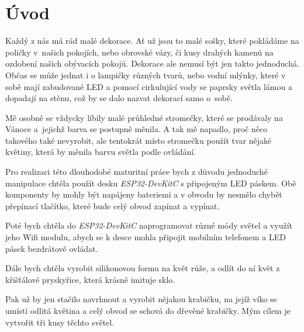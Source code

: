 \chapter*{Úvod}


Každý z nás má rád malé dekorace. Ať už jsou to malé sošky, které pokládáme na poličky v~našich pokojích, nebo obrovské vázy, či kusy drahých kamenů na ozdobení našich obývacích pokojů. Dekorace ale nemusí být jen takto jednoduchá. Občas se může jednat i o lampičky různých tvarů, nebo vodní mlýnky, které v sobě mají zabudované LED a pomocí cirkulující vody se paprsky světla lámou a  dopadají na stěnu, což by se dalo nazvat dekorací samo o~sobě.


Mě osobně se vždycky líbily malé průhledné stromečky, které se prodávaly na Vánoce a~jejichž barva se postupně měnila. A tak mě napadlo, proč něco takového také nevyrobit, ale tentokrát místo stromečku použít tvar nějaké květiny, která by měnila barvu světla podle ovládání. 


Pro realizaci této dlouhodobé maturitní práce bych z důvodu jednoduché manipulace chtěla použít desku \textit{ESP32-DevKitC} s připojeným LED páskem. Obě komponenty by mohly být napájeny bateriemi a v obvodu by nesmělo chybět přepínací tlačítko, které bude celý obvod zapínat a vypínat.

Poté bych chtěla do \textit{ESP32-DevKitC} naprogramovat různé módy světel a využít jeho Wifi modulu, abych se k desce mohla připojit mobilním telefonem a LED pásek bezdrátově ovládat. 

Dále bych chtěla vyrobit silikonovou formu na květ růže, a odlít do ní květ z křišťálové pryskyřice, která krásně imituje sklo.

Pak už by jen stačilo navrhnout a vyrobit nějakou krabičku, na jejíž víko se umístí odlitá květina a celý obvod se schová do dřevěné krabičky. Mým cílem je vytvořit tři kusy těchto světel.


